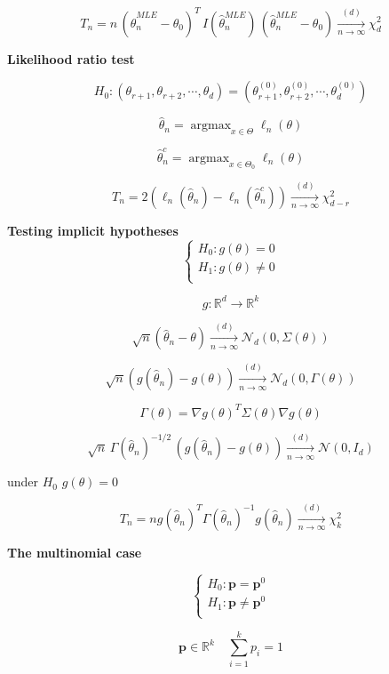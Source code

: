 \documentclass[12pt,a4paper]{article}
\DeclareMathOperator*{\argmax}{argmax}
\begin{document}
\[
	T_n = n \, \left(\hat{\theta}_{n}^{MLE} - \theta_0\right)^T \, I(\hat{\theta}_{n}^{MLE}) \, \left(\hat{\theta}_{n}^{MLE} - \theta_0\right) 
		\xrightarrow[n \rightarrow \infty]{(d)} \chi^2_{d}
\]

\textbf{Likelihood ratio test}

\[
	H_0: (\theta_{r+1},\theta_{r+2},\cdots,\theta_{d}) = (\theta_{r+1}^{(0)},\theta_{r+2}^{(0)},\cdots,\theta_{d}^{(0)})
\]

\[
\hat{\theta}_n = \argmax_{x \in \Theta} \ell_n(\theta)
\]

\[
\hat{\theta}_n^c = \argmax_{x \in \Theta_0} \ell_n(\theta)
\]

\[
T_n = 2(\ell_n(\hat{\theta}_n)- \ell_n(\hat{\theta}_n^c )) \xrightarrow[n \rightarrow \infty]{(d)} \chi^2_{d-r}
\]


\textbf{Testing implicit hypotheses}
\[
\begin{cases}
H_0:g(\theta) = 0 \\
H_1:g(\theta) \neq 0 \\
\end{cases}
\]

\[
	g: \mathbb{R}^d \rightarrow \mathbb{R}^k
\]


\[
	\sqrt{n} (\hat{\theta}_n - \theta) \xrightarrow[n \rightarrow \infty]{(d)} \mathcal{N}_d(0,\Sigma(\theta))
\]

\[
	\sqrt{n} (g(\hat{\theta}_n) - g(\theta)) \xrightarrow[n \rightarrow \infty]{(d)} \mathcal{N}_d(0,\Gamma(\theta))
\]

\[
\Gamma(\theta) = \nabla g(\theta) ^T \Sigma(\theta) \nabla g(\theta)
\]

\[
	\sqrt{n}\,\Gamma(\hat{\theta}_n)^{-1/2}\,\left( g(\hat{\theta}_n) - g(\theta)\right) \xrightarrow[n \rightarrow \infty]{(d)} \mathcal{N}\left(0,I_d\right)
\]

under $H_0$ $g(\theta) = 0 $

\[
	T_n = n g(\hat{\theta}_n)^T \Gamma(\hat{\theta}_n)^{-1} g(\hat{\theta}_n) \xrightarrow[n \rightarrow \infty]{(d)} \chi^2_k
\]

\textbf{The multinomial case}

\[
\begin{cases}
H_0: \mathbf{p} = \mathbf{p}^0 \\
H_1: \mathbf{p} \neq \mathbf{p}^0 \\
\end{cases}
\]

\[
\mathbf{p} \in \mathbb{R}^k \quad \sum_{i = 1}^{k} p_i = 1
\]
\end{document}
